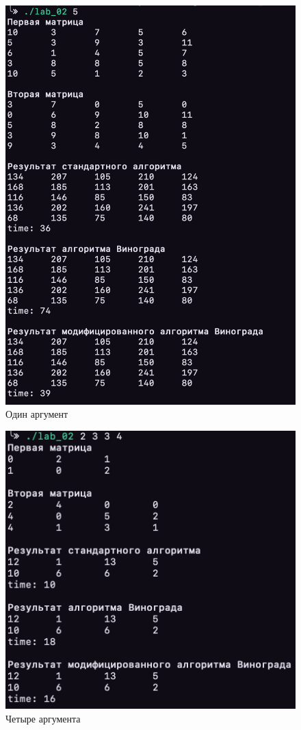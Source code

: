 \documentclass[a4paper,12pt]{article}
\begin{document}
\begin{figure}[H]
    \centering
    \includegraphics[scale=0.5]{one_arg}
    \caption{Один аргумент}
    \label{img:one-arg}
\end{figure}

\begin{figure}[H]
    \centering
    \includegraphics[scale=0.5]{four_arg}
    \caption{Четыре аргумента}
    \label{img:four-arg}
\end{figure}
\end{document}
